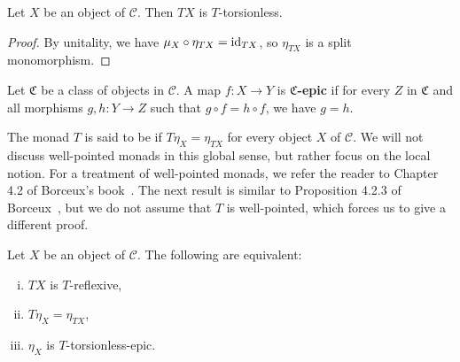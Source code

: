\begin{lemma}\label{lem:monad-app-torsionless}
  Let $X$ be an object of $\mathcal{C}$. Then $TX$ is $T$-torsionless.
\end{lemma}

\begin{proof}
  By unitality, we have $\mu_X \circ \eta_{TX} = \mathrm{id}_{TX}$, so $\eta_{TX}$ is a split monomorphism.
\end{proof}

\begin{definition}\label{def:rel-epi}
  Let $\mathfrak{C}$ be a class of objects in $\mathcal{C}$. A map $f : X \to Y$ is \textbf{$\mathfrak{C}$-epic} if for every $Z$ in $\mathfrak{C}$ and all morphisms $g, h : Y \to Z$ such that $g \circ f = h \circ f$, we have $g = h$.
\end{definition}

The monad $T$ is said to be  if $T\eta_X = \eta_{TX}$ for every object $X$ of $\mathcal{C}$.
We will not discuss well-pointed monads in this global sense, but rather focus on the local notion.
For a treatment of well-pointed monads, we refer the reader to Chapter 4.2 of Borceux's book~\cite{Borceux_1994_II}.
The next result is similar to Proposition 4.2.3 of Borceux~\cite{Borceux_1994_II}, but we do not assume that $T$ is well-pointed, which forces us to give a different proof.

\begin{proposition}\label{prp:monad-well-pointedness-torsionless-epi}
  Let $X$ be an object of $\mathcal{C}$. The following are equivalent:
  \begin{enumerate}[(i), noitemsep]
    \item $TX$ is $T$-reflexive,
    \item $T\eta_X = \eta_{TX}$,
    \item $\eta_X$ is $T$-torsionless-epic.
  \end{enumerate}
\end{proposition}

